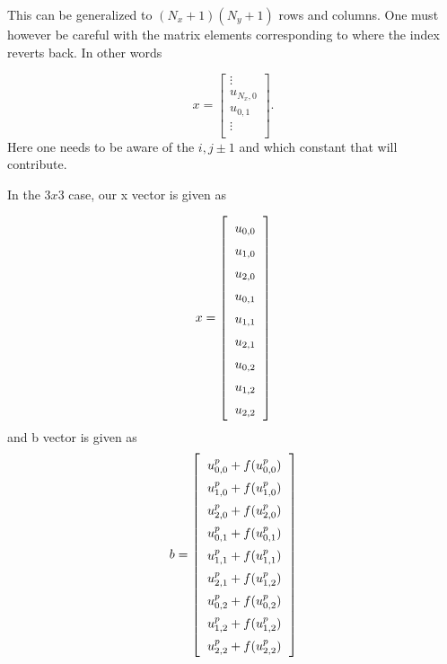 \documentclass[norsk,a4paper,12pt]{scrartcl}
\begin{document}
This can be generalized to $(N_x+1)(N_y+1)$ rows and columns. One must however be careful with the matrix elements corresponding to where the index reverts back. In other words

\begin{equation*}
        x = \begin{bmatrix}
    \vdots\\
    u_{N_x, 0}\\
    u_{0, 1}\\
    \vdots\\
    \end{bmatrix}.
\end{equation*}
Here one needs to be aware of the $i,j \pm 1$ and which constant that will contribute.

In the $3x3$ case, our x vector is given as 

\begin{equation*}
\renewcommand{\arraystretch}{1.5}
  \setlength{\arraycolsep}{6pt}
    x = \left[\begin{array}{c}
    u_{0, 0}\\
    u_{1, 0}\\
    u_{2,0}\\
    u_{0,1}\\
    u_{1,1}\\
    u_{2,1}\\
    u_{0,2}\\
    u_{1,2}\\
    u_{2,2}\\
\end{array}\right]
\end{equation*}
and b vector is given as 
\begin{equation*}
\renewcommand{\arraystretch}{1.5}
  \setlength{\arraycolsep}{6pt}
    b = \left[\begin{array}{c}
    u_{0, 0}^p + f(u_{0,0}^p)\\
    u_{1, 0}^p+ f(u_{1,0}^p)\\
    u_{2,0}^p+ f(u_{2,0}^p)\\
    u_{0,1}^p+ f(u_{0,1}^p)\\
    u_{1,1}^p+ f(u_{1,1}^p)\\
    u_{2,1}^p+ f(u_{1,2}^p)\\
    u_{0,2}^p+ f(u_{0,2}^p)\\
    u_{1,2}^p+ f(u_{1,2}^p)\\
    u_{2,2}^p+ f(u_{2,2}^p)\\
\end{array}\right]
\end{equation*}
\end{document}
